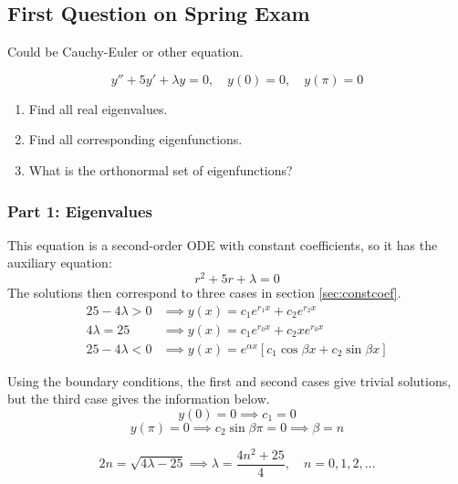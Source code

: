 \subsection{First Question on Spring Exam}
Could be Cauchy-Euler or other equation.

\begin{equation}
    y'' + 5y' + \lambda y = 0,\quad y(0)=0,\quad y(\pi)=0
\end{equation}

\begin{enumerate}
    \item Find all real eigenvalues.
    \item Find all corresponding eigenfunctions.
    \item What is the orthonormal set of eigenfunctions?
\end{enumerate}

\subsubsection{Part 1: Eigenvalues}
This equation is a second-order ODE with constant coefficients, so it has the auxiliary equation:
\begin{equation*}
    r^2 + 5r + \lambda = 0
\end{equation*}
The solutions then correspond to three cases in section \ref{sec:constcoef}.
\begin{align*}
    25 - 4\lambda>0 & \implies y(x) = c_1 e^{r_1 x} + c_2 e^{r_2 x}\\
    4\lambda=25 & \implies y(x) = c_1 e^{r_0 x} + c_2 x e^{r_0 x}\\
    25 - 4\lambda<0 & \implies y(x) = e^{\alpha x}[c_1 \cos \beta x + c_2 \sin \beta x]
\end{align*}

Using the boundary conditions, the first and second cases give trivial solutions, but the third case gives the information below.
\begin{equation*}
    y(0)=0 \implies c_1 = 0
\end{equation*}
\begin{equation*}
    y(\pi)=0 \implies c_2 \sin \beta\pi = 0 \implies \beta = n
\end{equation*}

\begin{equation*}
    2n = \sqrt{4\lambda - 25} \implies \lambda = \frac{4n^2+25}{4}, \quad n=0,1,2,\dots
\end{equation*}

